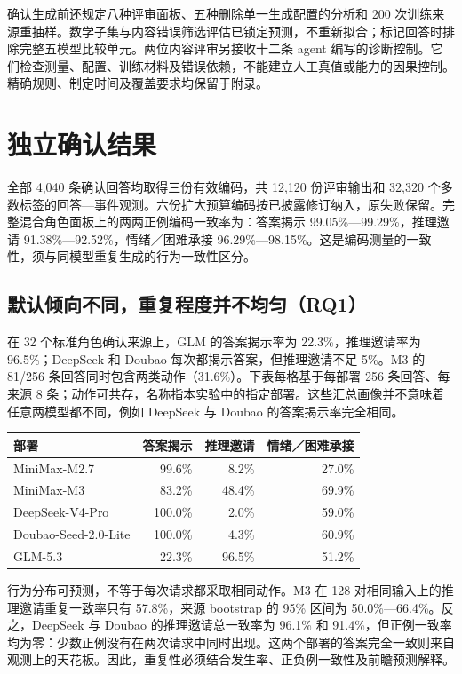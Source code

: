 \documentclass[11pt,a4paper,UTF8]{ctexart}
\begin{document}
确认生成前还规定八种评审面板、五种删除单一生成配置的分析和 200 次训练来源重抽样。数学子集与内容错误筛选评估已锁定预测，不重新拟合；标记回答时排除完整五模型比较单元。两位内容评审另接收十二条 agent 编写的诊断控制。它们检查测量、配置、训练材料及错误依赖，不能建立人工真值或能力的因果控制。精确规则、制定时间及覆盖要求均保留于附录。

\section{独立确认结果}

全部 4,040 条确认回答均取得三份有效编码，共 12,120 份评审输出和 32,320 个多数标签的回答—事件观测。六份扩大预算编码按已披露修订纳入，原失败保留。完整混合角色面板上的两两正例编码一致率为：答案揭示 99.05\%—99.29\%，推理邀请 91.38\%—92.52\%，情绪／困难承接 96.29\%—98.15\%。这是编码测量的一致性，须与同模型重复生成的行为一致性区分。

\subsection{默认倾向不同，重复程度并不均匀（RQ1）}

在 32 个标准角色确认来源上，GLM 的答案揭示率为 22.3\%，推理邀请率为 96.5\%；DeepSeek 和 Doubao 每次都揭示答案，但推理邀请不足 5\%。M3 的 81/256 条回答同时包含两类动作（31.6\%）。下表每格基于每部署 256 条回答、每来源 8 条；动作可共存，名称指本实验中的指定部署。这些汇总画像并不意味着任意两模型都不同，例如 DeepSeek 与 Doubao 的答案揭示率完全相同。

\begin{center}\small
\begin{tabular}{lrrr}
\toprule
部署 & 答案揭示 & 推理邀请 & 情绪／困难承接 \\
\midrule
MiniMax-M2.7 & 99.6\% & 8.2\% & 27.0\% \\
MiniMax-M3 & 83.2\% & 48.4\% & 69.9\% \\
DeepSeek-V4-Pro & 100.0\% & 2.0\% & 59.0\% \\
Doubao-Seed-2.0-Lite & 100.0\% & 4.3\% & 60.9\% \\
GLM-5.3 & 22.3\% & 96.5\% & 51.2\% \\
\bottomrule
\end{tabular}
\end{center}

行为分布可预测，不等于每次请求都采取相同动作。M3 在 128 对相同输入上的推理邀请重复一致率只有 57.8\%，来源 bootstrap 的 95\% 区间为 50.0\%—66.4\%。反之，DeepSeek 与 Doubao 的推理邀请总一致率为 96.1\% 和 91.4\%，但正例一致率均为零：少数正例没有在两次请求中同时出现。这两个部署的答案完全一致则来自观测上的天花板。因此，重复性必须结合发生率、正负例一致性及前瞻预测解释。
\end{document}
